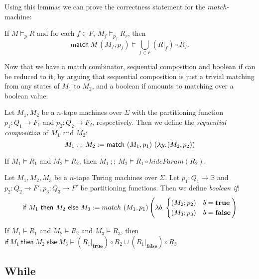 \documentclass{psartcl}
\newcommand{\lam}[2]{\lambda#1{.}\hskip.7pt#2}
\newcommand{\from}{:}
\renewcommand{\to}{\rightarrow}
\newcommand{\Bool}{\mathbb{B}}
\newcommand{\true}{\mathbf{true}}
\newcommand{\false}{\mathbf{false}}
\newcommand{\at}[2][]{#1|_{#2}}
\newcommand{\MS}[1]{\textsf{#1}}
\newcommand{\mseq}{~;;~}
\newcommand{\mif}[3]{\MS{if}~#1~\MS{then}~#2~\MS{else}~#3}
\newcommand{\mmatch}{\MS{match}}
\begin{document}
Using this lemmas we can prove the correctness statement for the $match$-machine:
\begin{lemma}
  If $M \vDash_p R$ and for each $f \in F$, $M_f \vDash_{p_f} R_r$, then
  $$\mmatch~M~(M_f, p_f) \vDash \bigcup_{f \in F} (R \at f) \circ R_f.$$
\end{lemma}

Now that we have a match combinator, sequential composition and boolean if can be reduced to it, by arguing that sequential composition is just a
trivial matching from any states of $M_1$ to $M_2$, and a boolean if amounts to matching over a boolean value:

\begin{definition}
  \label{def:seq}
  Let $M_1, M_2$ be a $n$-tape machines over $\Sigma$ with the partitioning function $p_1 \from Q_1 \to F_1$ and $p_2 \from Q_2 \to F_2$,
  respectively.  Then we define the \emph{sequential composition} of $M_1$ and $M_2$:
  $$M_1 \mseq M_2 := \mmatch~(M_1, p_1)~(\lam y (M_2, p_2))$$
\end{definition}

\begin{corollary}
  \label{lem:seq}
  If $M_1 \vDash R_1$ and $M_2 \vDash R_2$, then $M_1 \mseq M_2 \vDash R_1 \circ hideParam(R_2)$.
\end{corollary}

\begin{definition}[Boolean if]
  \label{def:if}
  Let $M_1, M_2, M_3$ be a $n$-tape Turing machines over $\Sigma$.
  Let $p_1 \from Q_1 \to \Bool$ and $p_2 \from Q_2 \to F', p_3 \from Q_3 \to F'$ be partitioning functions.
  Then we define \emph{boolean if}:
  $$\mif{M_1}{M_2}{M_3} := match~(M_1, p_1) \left(\lam b \begin{cases} (M_2; p_2) & b = \true \\ (M_3; p_3) & b = \false \end{cases} \right)$$
\end{definition}

\begin{corollary}
  \label{lem:if}
  If $M_1 \vDash R_1$ and $M_2 \vDash R_2$ and $M_3 \vDash R_3$, then
  $\mif{M_1}{M_2}{M_3} \vDash (R_1 \at \true) \circ R_2 \cup (R_1 \at \false) \circ R_3$.
\end{corollary}


\subsection{While}
\end{document}
